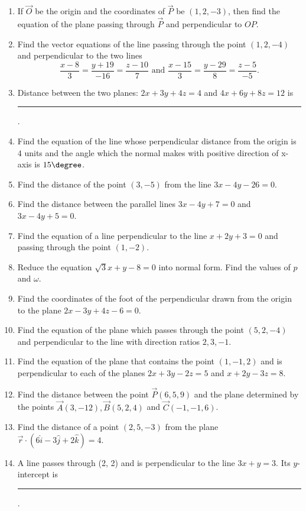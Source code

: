 \begin{enumerate}[label=\thesubsection.\arabic*, ref=\thesubsection.\theenumi]
\item If $\vec{O}$ be the origin and the coordinates of $\vec{P}$ be $(1, 2, -3)$,  then find the equation of the plane passing through $\vec{P}$ and perpendicular to $OP$.
\item Find the vector equations of the line passing through the point $(1, 2, -4)$ and perpendicular to the two lines
$$\frac{x-8}{3}=\frac{y+19}{-16}=\frac{z-10}{7}\text{ and } \frac{x-15}{3}=\frac{y-29}{8}=\frac{z-5}{-5}.$$
\item Distance between the two planes: $2x+3y+4z=4$ and $4x+6y+8z=12$ is \label{prob:22}
\rule{1cm}{0.1pt}.
\item Find the equation of the line whose perpendicular distance from the origin is $4$ units and the angle which the normal makes with positive direction of x-axis is $15\degree$.
\item Find the distance of the point $(3, -5)$ from the line $3x-4y-26=0$.
\item Find the distance between the parallel lines $3x-4y+7=0$ and $3x-4y+5=0$.
\item Find the equation of a line perpendicular to the line $x+2y+3=0$ and passing through the point $(1, -2)$.
\item Reduce the equation $\sqrt3x+y-8=0$ into normal form. Find the values of $p$ and $\omega$.
\item Find the coordinates of the foot of the perpendicular drawn from the origin to the plane $2x -3y +4z -6 = 0$.
\item Find the equation of the plane which passes through the point $(5,  2,  -4)$ and perpendicular to the line with direction ratios $2,  3,  -1$.
\item Find the equation of the plane that contains the point $(1,  -1,  2)$ and is perpendicular to each of the planes $2x +3y -2z =5$ and $x +2y -3z =8$.
\item Find the distance between the point $\vec{P}(6,  5,  9)$ and the plane determined by the points $\vec{A}(3,  -1 2),  \vec{B}( 5,  2, 4)$ and $\vec{C}(-1,  -1,  6)$.
\item Find the distance of a point $(2,  5,  -3)$ from the plane $\overrightarrow{r} \cdot (6\hat{i} -3\hat{j} +2\hat{k}) =4$.
\item A line passes through (2, 2) and is perpendicular to the line $3x+y=3$. Its $y$-intercept is 
\rule{1cm}{0.1pt}.
		
\end{enumerate}
